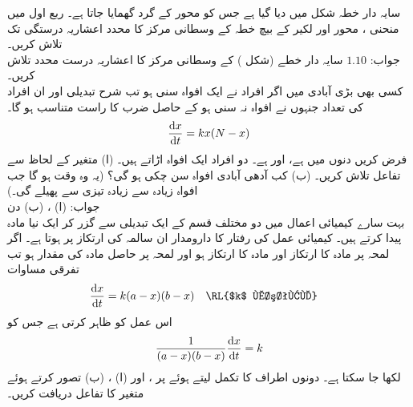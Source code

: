 سایہ دار خطہ شکل  میں دیا گیا ہے جس کو محور   کے گرد گھمایا جاتا ہے۔
ربع اول میں منحنی ، محور  اور لکیر   کے بیچ خطہ کے وسطانی مرکز کا  محدد  اعشاریہ درستگی تک تلاش کریں۔\\
جواب:\quad
$1.10$
سایہ دار خطے  (شکل ) کے وسطانی مرکز کا  اعشاریہ درست  محدد  تلاش کریں۔
\\
کسی بھی بڑی آبادی  میں اگر  افراد نے ایک افواہ سنی ہو تب  شرح تبدیلی   اور ان افراد کی تعداد جنہوں نے افواہ نہ سنی ہو کے حاصل ضرب کا راست متناسب ہو گا۔ 
\begin{align*}
\frac{\dif x}{\dif t}=kx(N-x)
\end{align*}
فرض کریں  دنوں میں ہے،  اور  ہے۔ دو افراد ایک افواہ اڑاتے ہیں۔ (ا) متغیر  کے لحاظ سے تفاعل  تلاش کریں۔ (ب) کب آدھی آبادی افواہ سن چکی ہو گی؟ (یہ وہ وقت ہو گا جب افواہ زیادہ سے زیادہ تیزی سے پھیلے گی۔)  \\
جواب:\quad
(ا) ، (ب)  دن
\\
بہت سارے کیمیائی اعمال میں دو مختلف قسم کے  ایک تبدیلی سے گزر کر ایک نیا مادہ پیدا کرتے ہیں۔ کیمیائی عمل کی رفتار کا دارومدار ان سالمہ کی ارتکاز پر ہوتا ہے۔ اگر لمحہ  پر مادہ  کا ارتکاز  اور مادہ  کا ارتکاز  ہو اور لمحہ  پر حاصل مادہ کی مقدار  ہو تب  تفرقی مساوات
\begin{align*}
\frac{\dif x}{\dif t}&=k(a-x)(b-x)&&\text{\RL{$k$ مستقل}}
\end{align*}
 اس عمل کو ظاہر کرتی ہے جس کو
\begin{align*}
\frac{1}{(a-x)(b-x)}\frac{\dif x}{\dif t}=k
\end{align*}
لکھا جا سکتا ہے۔ دونوں اطراف کا تکمل لیتے ہوئے  پر ، اور (ا) ، (ب)  تصور کرتے ہوئے  متغیر  کا تفاعل  دریافت کریں۔ 
\\
